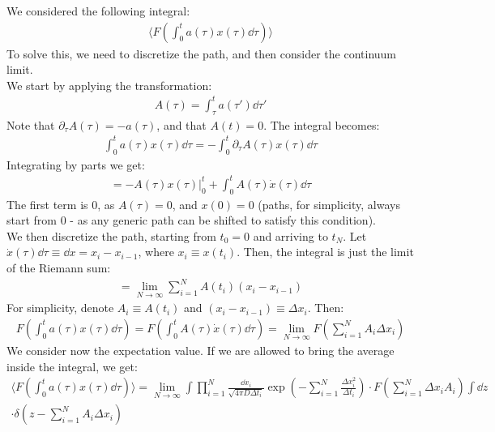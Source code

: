 \documentclass[../template.tex]{subfiles}
\begin{document}
We considered the following integral:
\begin{align*}
    \langle F\left(\int_{0}^{t} a(\tau) x(\tau) \dd{\tau}\right) \rangle
\end{align*}
To solve this, we need to discretize the path, and then consider the continuum limit.\\
We start by applying the transformation:
\begin{align*}
    A(\tau) = \int_{\tau}^{t} a(\tau') \dd{\tau'}
\end{align*}
Note that $\partial_\tau A(\tau) = -a(\tau)$, and that $A(t) = 0$. The integral becomes:
\begin{align*}
    \int_{0}^{t} a(\tau) x(\tau) \dd{\tau} = - \int_{0}^{t} \partial_\tau  A(\tau) x(\tau) \dd{\tau} 
\end{align*}  
Integrating by parts we get:
\begin{align*}
    = - A(\tau) x(\tau) \Big|_0^t + \int_0^t A(\tau) \dot{x}(\tau) \dd{\tau}
\end{align*}
The first term is $0$, as $A(\tau) = 0$, and $x(0) = 0$ (paths, for simplicity, always start from $0$ - as any generic path can be shifted to satisfy this condition).\\
We then discretize the path, starting from $t_0 = 0$ and arriving to $t_N$. Let $\dot{x}(\tau) \dd{\tau} \equiv \dd{x} = x_i - x_{i-1}$, where $x_i \equiv x(t_i)$. Then, the integral is just the limit of the Riemann sum:
\begin{align*}
    = \lim_{N \to \infty} \sum_{i=1}^N A(t_i) (x_i - x_{i-1})
\end{align*}        
For simplicity, denote $A_i \equiv A(t_i)$ and $(x_i - x_{i-1}) \equiv \Delta x_i$. Then:
\begin{align*}
    F\left(\int_0^t a(\tau) x(\tau) \dd{\tau}\right) = F\left(\int_{0}^{t} A(\tau) \dot{x}(\tau) \dd{\tau} \right) = \lim_{N \to \infty} F\left(\sum_{i=1}^N A_i \Delta x_i\right)
\end{align*}  
We consider now the expectation value. If we are allowed to bring the average inside the integral, we get:
\begin{align*}
    \langle F\left(\int_{0}^{t} a(\tau) x(\tau)\dd{\tau}\right) \rangle = \lim_{N \to \infty} \int \prod_{i=1}^N \frac{\dd{x_i}}{\sqrt{4 \pi D \Delta t_i}} \exp \left(-\sum_{i=1}^N \frac{\Delta x_i^2}{\Delta t_i} \right)  \cdot F\left(\sum_{i=1}^N \Delta x_i A_i\right) \int \dd{z}\\
    \cdot \delta\left(z-\sum_{i=1}^N A_i \Delta x_i\right)
\end{align*}
\end{document}

